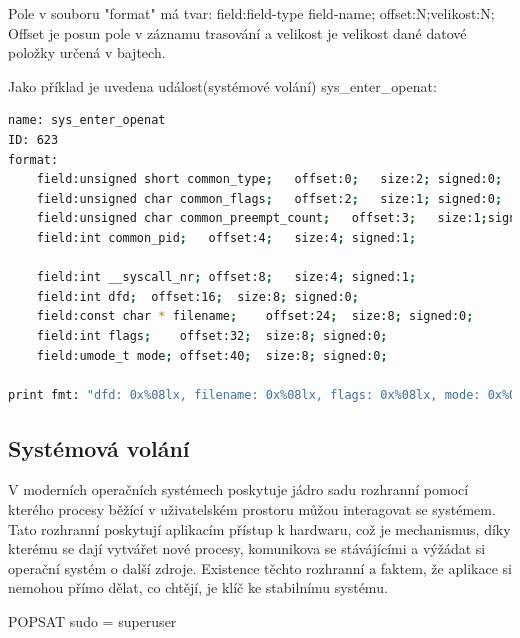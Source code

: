 Pole v souboru "format" má tvar:
field:field-type field-name; offset:N;velikost:N;
Offset je posun pole v záznamu trasování a velikost je velikost dané datové položky určená v bajtech.

Jako příklad je uvedena událost(systémové volání) sys_enter_openat:
\begin{lstlisting}[language=bash]
name: sys_enter_openat
ID: 623
format:
	field:unsigned short common_type;	offset:0;	size:2;	signed:0;
	field:unsigned char common_flags;	offset:2;	size:1;	signed:0;
	field:unsigned char common_preempt_count;	offset:3;	size:1;signed:0;
	field:int common_pid;	offset:4;	size:4;	signed:1;

	field:int __syscall_nr;	offset:8;	size:4;	signed:1;
	field:int dfd;	offset:16;	size:8;	signed:0;
	field:const char * filename;	offset:24;	size:8;	signed:0;
	field:int flags;	offset:32;	size:8;	signed:0;
	field:umode_t mode;	offset:40;	size:8;	signed:0;

print fmt: "dfd: 0x%08lx, filename: 0x%08lx, flags: 0x%08lx, mode: 0x%08lx", ((unsigned long)(REC->dfd)), ((unsigned long)(REC->filename)), ((unsigned long)(REC->flags)), ((unsigned long)(REC->mode))
\end{lstlisting}

\subsection{Systémová volání}

V moderních operačních systémech poskytuje jádro sadu rozhranní pomocí kterého procesy běžící v uživatelském prostoru můžou interagovat
se systémem. Tato rozhranní poskytují aplikacím přístup k hardwaru, což je mechanismus, díky kterému se dají vytvářet nové procesy,
komunikova se stávájícími a výžádat si operační systém o další zdroje. Existence těchto rozhranní a faktem, že aplikace si nemohou přímo
dělat, co chtějí, je klíč ke stabilnímu systému.

POPSAT sudo = superuser